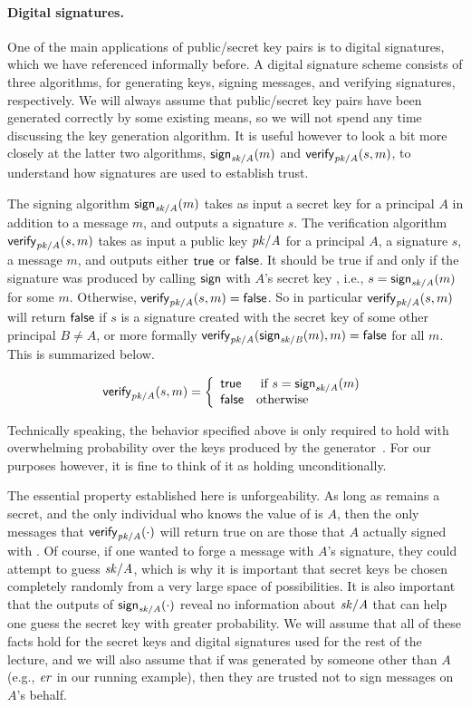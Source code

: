 \documentclass[11pt]{article}
\begin{document}
\paragraph{Digital signatures.}
One of the main applications of public/secret key pairs is to
digital signatures, which we have referenced informally before.
A digital signature scheme consists of three algorithms, for
generating keys, signing messages, and verifying signatures,
respectively. We will always assume that public/secret key pairs have
been generated correctly by some existing means, so we will not spend any
time discussing the key generation algorithm. It is useful however to
look a bit more closely at the latter two algorithms,
$\mathsf{sign}_{\mathit{sk/A}}(m)$ and $\mathsf{verify}_{\mathit{pk/A}}(s,m)$, to understand how
signatures are used to establish trust.

The signing algorithm $\mathsf{sign}_{\mathit{sk/A}}(m)$ takes as input a secret key  for
a principal $A$ in addition to a message $m$, and outputs a signature $s$. The
verification algorithm $\mathsf{verify}_{\mathit{pk/A}}(s,m)$ takes as input a public key
$\mathit{pk/A}$ for a principal $A$, a signature $s$, a message $m$, and outputs either
$\mathsf{true}$ or $\mathsf{false}$. It should be true if and only if the
signature was produced by calling $\mathsf{sign}$ with $A$'s secret key ,
i.e., $s = \mathsf{sign}_{\mathit{sk/A}}(m)$ for some $m$. Otherwise,
$\mathsf{verify}_{\mathit{pk/A}}(s,m) = \mathsf{false}$. So in particular $\mathsf{verify}_{\mathit{pk/A}}(s,m)$
will return $\mathsf{false}$ if $s$ is a signature created with the secret key of some
other principal $B \ne A$, or more formally
$\mathsf{verify}_{\mathit{pk/A}}(\mathsf{sign}_{\mathit{sk/B}}(m),m) = \mathsf{false}$ for all $m$.  This is
summarized below.

\[
\mathsf{verify}_{\mathit{pk/A}}(s,m) =
\left\{
\begin{array}{ll}
\mathsf{true} & \ \mbox{if}\ s = \mathsf{sign}_{\mathit{sk/A}}(m)\\
\mathsf{false} & \mbox{otherwise}
\end{array}
\right.
\]

Technically speaking, the behavior specified above is
only required to hold with overwhelming probability over the keys
produced by the generator~\citep{Katz14book}. For our purposes however,
it is fine to think of it as holding unconditionally.



The essential property established here is unforgeability. As long as
 remains a secret, and the only individual who knows the value of 
is $A$, then the only messages that $\mathsf{verify}_{\mathit{pk/A}}(\cdot)$ will return true on
are those that $A$ actually signed with . Of course, if one wanted to
forge a message with $A$'s signature, they could attempt to guess $\mathit{sk/A}$,
which is why it is important that secret keys be chosen completely randomly from
a very large space of possibilities. It is also important that the outputs of
$\mathsf{sign}_{\mathit{sk/A}}(\cdot)$ reveal no information about $\mathit{sk/A}$ that can help one
guess the secret key with greater probability. We will assume that all of these
facts hold for the secret keys and digital signatures used for the rest of the
lecture, and we will also assume that if  was generated by someone other
than $A$ (e.g., $\mathit{er}$ in our running example), then they are trusted not to
sign messages on $A$'s behalf.
\end{document}
